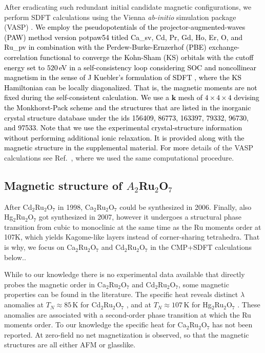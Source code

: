 \documentclass[10pt]{iopart}
\newcommand{\red}[1]{\textcolor{black}{#1}}
\begin{document}
After eradicating such redundant initial candidate magnetic configurations, we perform SDFT calculations using the Vienna \emph{ab-initio} simulation package (VASP) \cite{kresse1993ab,kresse1994ab,hobbs2001ab}. 
\red{We employ the pseudopotentials of the projector-augmented-waves (PAW) method version potpaw54 titled Ca\_sv, Cd, Pr, Gd, Ho, Er, O, and Ru\_pv in combination with the Perdew-Burke-Ernzerhof (PBE) exchange-correlation functional to converge the Kohn-Sham (KS) orbitals with the cutoff energy set to $520$\,eV in a self-consistency loop considering SOC \cite{steiner2016calculation} and noncollinear magnetism in the sense of J Kuebler's formulation of SDFT \cite{kubler2017theory}, where the KS Hamiltonian can be locally diagonalized. That is, the magnetic moments are not fixed during the self-consistent calculation.
We use a $\mathbf{k}$ mesh of $4\times4\times4$ devising the Monkhorst-Pack scheme and the structures that are listed in the inorganic crystal structure database \cite{ICSD_URL} under the ids 156409, 86773, 163397, 79332, 96730, and 97533. Note that we use the experimental crystal-structure information without performing additional ionic relaxation. It is provided along with the magnetic structure in the supplemental material. For more} details of the VASP calculations see Ref.\ \cite{huebsch2021benchmark}, where we used the same computational procedure.

\subsection{Magnetic structure of \texorpdfstring{$A_2$Ru$_2$O$_7$}{A2Ru2O7}} \label{subsec:Magnetic structure A}

After Cd$_2$Ru$_2$O$_7$ \cite{wang1998synthesis} in 1998, Ca$_2$Ru$_2$O$_7$ \cite{munenaka2006novel} could be synthesized in 2006. Finally, also Hg$_2$Ru$_2$O$_7$ \cite{yamamoto2007metal,klein2007hg} got synthesized in 2007, however it undergoes a structural phase transition \cite{van2012kagome} from cubic to monoclinic at the same time as the Ru moments order at 107K, which yields Kagome-like layers instead of corner-sharing tetrahedra. That is why, we focus on Ca$_2$Ru$_2$O$_7$ and Cd$_2$Ru$_2$O$_7$ in the CMP+SDFT calculations below..

While to our knowledge there is no experimental data available that directly probes the magnetic order in Ca$_2$Ru$_2$O$_7$ and Cd$_2$Ru$_2$O$_7$, some magnetic properties can be found in the literature.
The specific heat reveals distinct $\lambda$ anomalies at $T_N\approx85\,$K for Cd$_2$Ru$_2$O$_7$ \cite{jiao2018effect}, and at $T_N\approx107\,$K for Hg$_2$Ru$_2$O$_7$ \cite{klein2007hg}. These anomalies are associated with a second-order phase transition at which the Ru moments order. To our knowledge the specific heat for Ca$_2$Ru$_2$O$_7$ has not been reported. 
At zero-field no net magnetization is observed, so that the magnetic structures are all either AFM or glasslike. 
\end{document}

